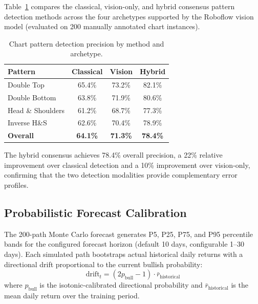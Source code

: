 \documentclass[10pt,a4paper,twoside]{article}
\begin{document}
Table~\ref{tab:pattern_perf} compares the classical, vision-only, and hybrid
consensus pattern detection methods across the four archetypes supported by the
Roboflow vision model (evaluated on 200 manually annotated chart instances).

\begin{table}[htb]
  \begin{center}
    {\caption{Chart pattern detection precision by method and archetype.}
    \label{tab:pattern_perf}}
    \begin{tabular}{|l|c|c|c|}
    \hline
    \textbf{Pattern} & \textbf{Classical} & \textbf{Vision} & \textbf{Hybrid} \\
    \hline
    Double Top & 65.4\% & 73.2\% & 82.1\% \\
    Double Bottom & 63.8\% & 71.9\% & 80.6\% \\
    Head \& Shoulders & 61.2\% & 68.7\% & 77.3\% \\
    Inverse H\&S & 62.6\% & 70.4\% & 78.9\% \\
    \hline
    \textbf{Overall} & \textbf{64.1\%} & \textbf{71.3\%} & \textbf{78.4\%} \\
    \hline
    \end{tabular}
  \end{center}
\end{table}

The hybrid consensus achieves 78.4\% overall precision, a 22\% relative
improvement over classical detection and a 10\% improvement over vision-only,
confirming that the two detection modalities provide complementary error
profiles.

\subsection{Probabilistic Forecast Calibration}

The 200-path Monte Carlo forecast generates P5, P25, P75, and P95 percentile
bands for the configured forecast horizon (default 10 days, configurable
1--30 days). Each simulated path bootstraps actual historical daily returns
with a directional drift proportional to the current bullish probability:
\begin{equation}
  \text{drift}_t = (2 p_{\text{bull}} - 1) \cdot \bar{r}_{\text{historical}}
\end{equation}
where $p_{\text{bull}}$ is the isotonic-calibrated directional probability and
$\bar{r}_{\text{historical}}$ is the mean daily return over the training period.
\end{document}
